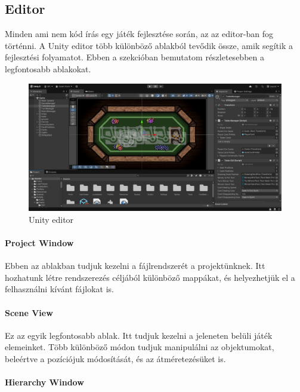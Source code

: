 \documentclass[]{thesis-ekf}
\theoremstyle{definition}
\theoremstyle{remark}
\begin{document}
\subsection{Editor}

\label{subsec-editor}
Minden ami nem kód írás egy játék fejlesztése során, az az editor-ban fog történni. A Unity editor több különböző ablakból tevődik össze, amik segítik a fejlesztési folyamatot. Ebben a szekcióban bemutatom részletesebben a legfontosabb ablakokat.

\begin{figure}[ht!]
	\centering
	\includegraphics[width=16cm]{UnityEditor}
	\caption{Unity editor}
	\label{fig-unityeditor}
\end{figure}

\paragraph{Project Window}

Ebben az ablakban tudjuk kezelni a fájlrendszerét a projektünknek. Itt hozhatunk létre rendszerezés céljából különböző mappákat, és helyezhetjük el a felhasználni kívánt fájlokat is. \cite{UnityProjectWindow}

\paragraph{Scene View}

Ez az egyik legfontosabb ablak. Itt tudjuk kezelni a jeleneten belüli játék elemeinket. Több különböző módon tudjuk manipulálni az objektumokat, beleértve a pozíciójuk módosítását, és az átméretezésüket is. \cite{UnitySceneView}

\paragraph{Hierarchy Window}
\end{document}
